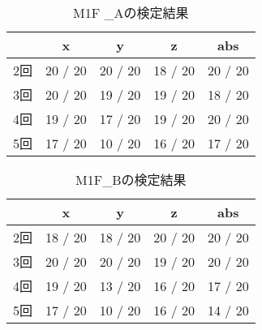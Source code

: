         \begin{table}[tb]
            \caption{M1F _Aの検定結果}
            \vspace{0.5cm}
            \centering
            \begin{tabular}{|c|c|c|c|c|}
                \hline
                \diagbox{}{} & x & y & z & abs \\\hline
                2回 & 20 / 20 & 20 / 20 & 18 / 20 & 20 / 20 \\
                3回 & 20 / 20 & 19 / 20 & 19 / 20 & 18 / 20 \\
                4回 & 19 / 20 & 17 / 20 & 19 / 20 & 20 / 20 \\
                5回 & 17 / 20 & 10 / 20 & 16 / 20 & 17 / 20 \\
                \hline
            \end{tabular}
        \end{table}
        \begin{table}[tb]
            \caption{M1F_Bの検定結果}
            \vspace{0.5cm}
            \centering
            \begin{tabular}{|c|c|c|c|c|}
                \hline
                \diagbox{}{} & x & y & z & abs \\\hline
                2回 & 18 / 20 & 18 / 20 & 20 / 20 & 20 / 20 \\
                3回 & 20 / 20 & 20 / 20 & 19 / 20 & 20 / 20 \\
                4回 & 19 / 20 & 13 / 20 & 16 / 20 & 17 / 20 \\
                5回 & 17 / 20 & 10 / 20 & 16 / 20 & 14 / 20 \\
                \hline
            \end{tabular}
        \end{table}

